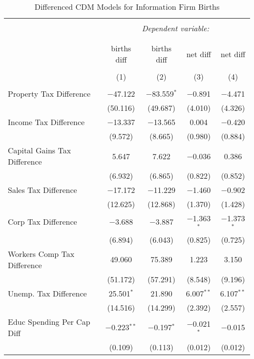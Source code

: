 
\begin{table}[!htbp] \centering 
  \caption{Differenced CDM Models for  Information Firm Births} 
  \label{} 
\begin{tabular}{@{\extracolsep{5pt}}lcccc} 
\\[-1.8ex]\hline 
\hline \\[-1.8ex] 
 & \multicolumn{4}{c}{\textit{Dependent variable:}} \\ 
\cline{2-5} 
\\[-1.8ex] & \multicolumn{4}{c}{ } \\ 
 & births diff & births diff & net diff & net diff \\ 
\\[-1.8ex] & (1) & (2) & (3) & (4)\\ 
\hline \\[-1.8ex] 
 Property Tax Difference & $-$47.122 & $-$83.559$^{*}$ & $-$0.891 & $-$4.471 \\ 
  & (50.116) & (49.687) & (4.010) & (4.326) \\ 
  Income Tax Difference & $-$13.337 & $-$13.565 & 0.004 & $-$0.420 \\ 
  & (9.572) & (8.665) & (0.980) & (0.884) \\ 
  Capital Gains Tax Difference & 5.647 & 7.622 & $-$0.036 & 0.386 \\ 
  & (6.932) & (6.865) & (0.822) & (0.852) \\ 
  Sales Tax Difference & $-$17.172 & $-$11.229 & $-$1.460 & $-$0.902 \\ 
  & (12.625) & (12.868) & (1.370) & (1.428) \\ 
  Corp Tax Difference & $-$3.688 & $-$3.887 & $-$1.363$^{*}$ & $-$1.373$^{*}$ \\ 
  & (6.894) & (6.043) & (0.825) & (0.725) \\ 
  Workers Comp Tax Difference & 49.060 & 75.389 & 1.223 & 3.150 \\ 
  & (51.172) & (57.291) & (8.548) & (9.196) \\ 
  Unemp. Tax Difference & 25.501$^{*}$ & 21.890 & 6.007$^{**}$ & 6.107$^{**}$ \\ 
  & (14.516) & (14.299) & (2.392) & (2.557) \\ 
  Educ Spending Per Cap Diff & $-$0.223$^{**}$ & $-$0.197$^{*}$ & $-$0.021$^{*}$ & $-$0.015 \\ 
  & (0.109) & (0.113) & (0.012) & (0.012) \\ 

\end{tabular}
\end{table}

